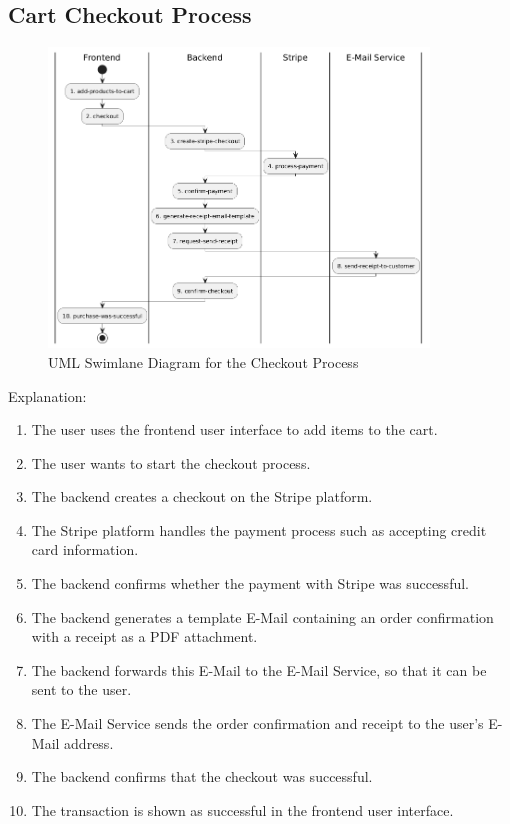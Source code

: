 \newpage
\hypertarget{__runtime_scenario_2}{%
\subsection{Cart Checkout Process}\label{__runtime_scenario_2}}
\begin{figure}[!h!]
  \centering
  \includegraphics[width=0.9\textwidth]{images/uml_swimlane_checkout.png}
  \caption{UML Swimlane Diagram for the Checkout Process}
\end{figure}

Explanation:
\begin{enumerate}
  \item The user uses the frontend user interface to add items to the cart.
  \item The user wants to start the checkout process.
  \item The backend creates a checkout on the Stripe platform.
  \item The Stripe platform handles the payment process such as accepting credit card information.
  \item The backend confirms whether the payment with Stripe was successful.
  \item The backend generates a template E-Mail containing an order confirmation with a receipt as a PDF attachment.
  \item The backend forwards this E-Mail to the E-Mail Service, so that it can be sent to the user.
  \item The E-Mail Service sends the order confirmation and receipt to the user's E-Mail address.
  \item The backend confirms that the checkout was successful.
  \item The transaction is shown as successful in the frontend user interface.
\end{enumerate}

